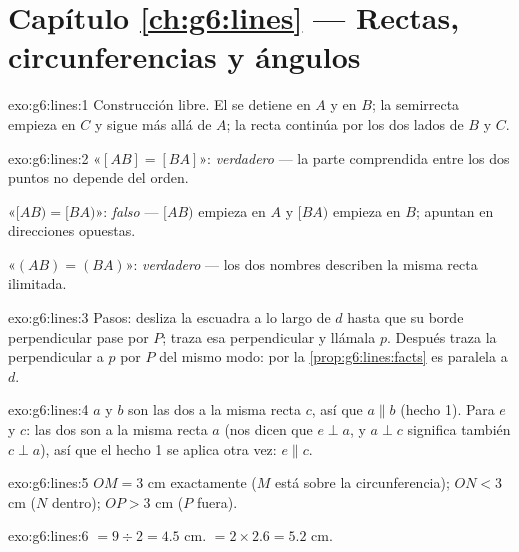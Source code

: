 \section*{Capítulo \ref{ch:g6:lines} --- Rectas, circunferencias y ángulos}

\begin{solution}{exo:g6:lines:1}
Construcción libre. El  se detiene en $A$ y en $B$; la semirrecta empieza en
$C$ y sigue más allá de $A$; la recta continúa por los dos lados de $B$
y $C$.
\end{solution}

\begin{solution}{exo:g6:lines:2}
«$[AB] = [BA]$»: \emph{verdadero} --- la parte comprendida entre los dos puntos no
depende del orden.

«$[AB) = [BA)$»: \emph{falso} --- $[AB)$ empieza en $A$ y $[BA)$ empieza
en $B$; apuntan en direcciones opuestas.

«$(AB) = (BA)$»: \emph{verdadero} --- los dos nombres describen la misma
recta ilimitada.
\end{solution}

\begin{solution}{exo:g6:lines:3}
Pasos: desliza la escuadra a lo largo de $d$ hasta que su borde perpendicular
pase por $P$; traza esa perpendicular y llámala $p$. Después traza
la perpendicular a $p$ por $P$ del mismo modo: por la
\cref{prop:g6:lines:facts} es paralela a $d$.
\end{solution}

\begin{solution}{exo:g6:lines:4}
$a$ y $b$ son las dos  a la misma recta $c$, así que
$a \parallel b$ (hecho 1). Para $e$ y $c$: las dos son  a
la misma recta $a$ (nos dicen que $e \perp a$, y $a \perp c$ significa
también $c \perp a$), así que el hecho 1 se aplica otra vez: $e \parallel c$.
\end{solution}

\begin{solution}{exo:g6:lines:5}
$OM = 3$ cm exactamente ($M$ está sobre la circunferencia); $ON < 3$ cm ($N$ dentro);
$OP > 3$ cm ($P$ fuera).
\end{solution}

\begin{solution}{exo:g6:lines:6}
 $= 9 \div 2 = 4.5$ cm. \quad {} $= 2 \times 2.6 = 5.2$ cm.
\end{solution}

